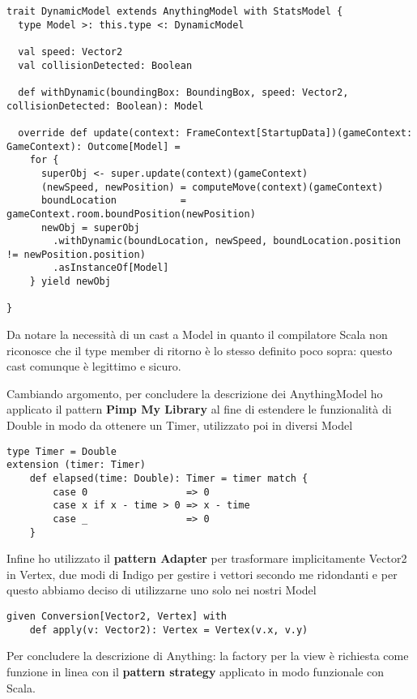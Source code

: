 \begin{lstlisting}[basicstyle=\tiny]
trait DynamicModel extends AnythingModel with StatsModel {
  type Model >: this.type <: DynamicModel

  val speed: Vector2
  val collisionDetected: Boolean

  def withDynamic(boundingBox: BoundingBox, speed: Vector2, collisionDetected: Boolean): Model

  override def update(context: FrameContext[StartupData])(gameContext: GameContext): Outcome[Model] =
    for {
      superObj <- super.update(context)(gameContext)
      (newSpeed, newPosition) = computeMove(context)(gameContext)
      boundLocation           = gameContext.room.boundPosition(newPosition)
      newObj = superObj
        .withDynamic(boundLocation, newSpeed, boundLocation.position != newPosition.position)
        .asInstanceOf[Model]
    } yield newObj

} 
\end{lstlisting}

Da notare la necessità di un cast a Model in quanto il compilatore Scala non riconosce che il type member di ritorno è lo stesso definito poco sopra: questo cast comunque è legittimo e sicuro. 

Cambiando argomento, per concludere la descrizione dei AnythingModel ho applicato il pattern \textbf{Pimp My Library} al fine di estendere le funzionalità di Double in modo da ottenere un Timer, utilizzato poi in diversi Model 
\begin{lstlisting}[basicstyle=\tiny]
type Timer = Double
extension (timer: Timer)
    def elapsed(time: Double): Timer = timer match {
        case 0                 => 0
        case x if x - time > 0 => x - time
        case _                 => 0
    }
\end{lstlisting}

Infine ho utilizzato il \textbf{pattern Adapter} per trasformare implicitamente Vector2 in Vertex, due modi di Indigo per gestire i vettori secondo me ridondanti e per questo abbiamo deciso di utilizzarne uno solo nei nostri Model
\begin{lstlisting}[basicstyle=\tiny]
given Conversion[Vector2, Vertex] with
    def apply(v: Vector2): Vertex = Vertex(v.x, v.y)
\end{lstlisting}

Per concludere la descrizione di Anything: la factory per la view è richiesta come funzione in linea con il \textbf{pattern strategy} applicato in modo funzionale con Scala.


